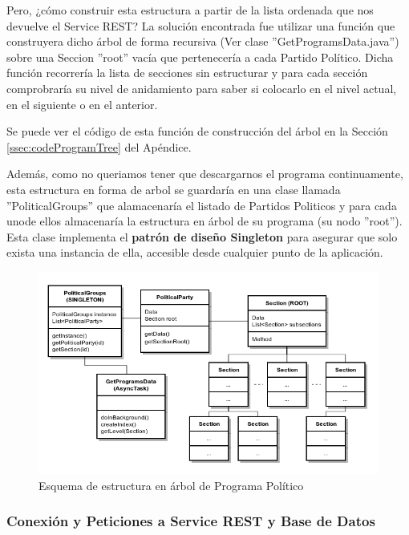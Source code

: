 	Pero, ¿cómo construir esta estructura a partir de la lista ordenada que nos devuelve el Service REST? La solución encontrada fue utilizar una función que construyera dicho árbol de forma recursiva (Ver clase ''GetProgramsData.java'') sobre una Seccion ''root'' vacía que pertenecería a cada Partido Político. Dicha función recorrería la lista de secciones sin estructurar y para cada sección comprobraría su nivel de anidamiento para saber si colocarlo en el nivel actual, en el siguiente o en el anterior.
	
	Se puede ver el código de esta función de construcción del árbol en la Sección \ref{ssec:codeProgramTree} del Apéndice.
	  
	Además, como no queriamos tener que descargarnos el programa continuamente, esta estructura en forma de arbol se guardaría en una clase llamada ''PoliticalGroups'' que alamacenaría el listado de Partidos Politicos y para cada unode ellos almacenaría la estructura en árbol de su programa (su nodo ''root''). Esta clase implementa el \textbf{patrón de diseño Singleton} para asegurar que solo exista una instancia de ella, accesible desde cualquier punto de la aplicación. 
	  
	\begin{figure}[H]
	  \centering
	    \includegraphics[keepaspectratio, scale=0.6]{Media/Diagrams/classSectionTree.png}
	  \caption{Esquema de estructura en árbol de Programa Político}
	  \label{fig:classSecTree}
	\end{figure}	
	
	\subsubsection{Conexión y Peticiones a Service REST y Base de Datos}

